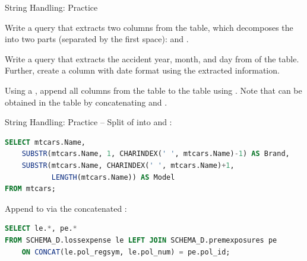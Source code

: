 \documentclass{beamer}
\begin{document}
\begin{frame}{String Handling: Practice}
\begin{prob}
Write a query that extracts two columns from the  table, which
decomposes the  into two parts (separated by the first space): 
and .
\end{prob}
\vspace{0.5em}
\begin{prob}
Write a query that extracts the accident year, month, and day from  of the
 table. Further, create a column with date format using the
extracted information.
\end{prob}
\vspace{0.5em}
\begin{prob}
Using a , append all columns from the 
table to the  table using . Note that
 can be obtained in the  table by concatenating
 and .
\end{prob}
\end{frame}

\begin{frame}[fragile]{String Handling: Practice -- }
{\small Split  of  into  and :}
\begin{lstlisting}[language=SQL]
SELECT mtcars.Name,
    SUBSTR(mtcars.Name, 1, CHARINDEX(' ', mtcars.Name)-1) AS Brand,
    SUBSTR(mtcars.Name, CHARINDEX(' ', mtcars.Name)+1,
           LENGTH(mtcars.Name)) AS Model
FROM mtcars;
\end{lstlisting}
\vspace{0.3em}
{\small Append  to  via the concatenated :}
\begin{lstlisting}[language=SQL]
SELECT le.*, pe.*
FROM SCHEMA_D.lossexpense le LEFT JOIN SCHEMA_D.premexposures pe
    ON CONCAT(le.pol_regsym, le.pol_num) = pe.pol_id;
\end{lstlisting}
\end{frame}
\end{document}
